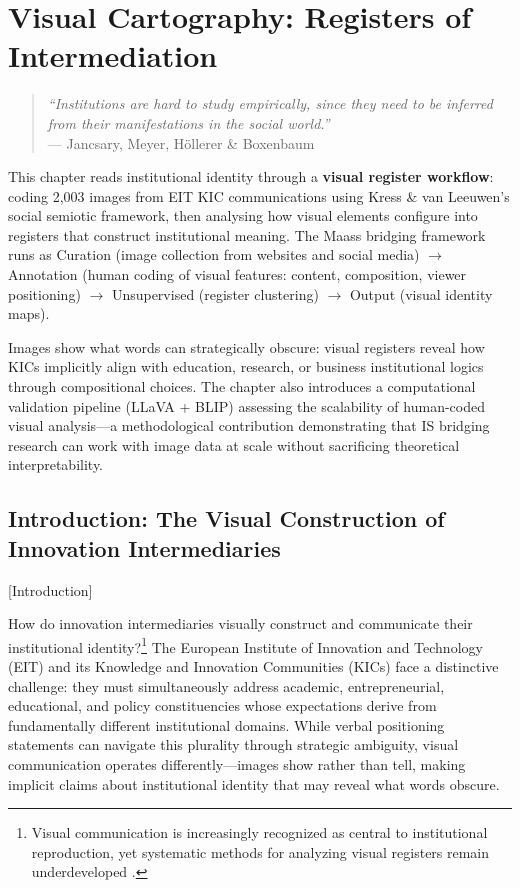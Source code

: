 \documentclass[../main.tex]{subfiles}
\begin{document}
\chapter{Visual Cartography: Registers of Intermediation}
\margintoc

\begin{quote}
\textit{``Institutions are hard to study empirically, since they need to be inferred from their manifestations in the social world.''}\\
--- Jancsary, Meyer, Höllerer \& Boxenbaum \cite{jancsary2018institutions}
\end{quote}

\begin{chapteroverview}
This chapter reads institutional identity through a \textbf{visual register workflow}: coding 2,003 images from EIT KIC communications using Kress \& van Leeuwen's social semiotic framework, then analysing how visual elements configure into registers that construct institutional meaning. The Maass bridging framework runs as Curation (image collection from websites and social media) $\rightarrow$ Annotation (human coding of visual features: content, composition, viewer positioning) $\rightarrow$ Unsupervised (register clustering) $\rightarrow$ Output (visual identity maps).

Images show what words can strategically obscure: visual registers reveal how KICs implicitly align with education, research, or business institutional logics through compositional choices. The chapter also introduces a computational validation pipeline (LLaVA + BLIP) assessing the scalability of human-coded visual analysis---a methodological contribution demonstrating that IS bridging research can work with image data at scale without sacrificing theoretical interpretability.
\end{chapteroverview}

\section{Introduction: The Visual Construction of Innovation Intermediaries}[Introduction]

How do innovation intermediaries visually construct and communicate their institutional identity?\footnote{Visual communication is increasingly recognized as central to institutional reproduction, yet systematic methods for analyzing visual registers remain underdeveloped \cite{meyer2013visualizing}.} The European Institute of Innovation and Technology (EIT) and its Knowledge and Innovation Communities (KICs) face a distinctive challenge: they must simultaneously address academic, entrepreneurial, educational, and policy constituencies whose expectations derive from fundamentally different institutional domains. While verbal positioning statements can navigate this plurality through strategic ambiguity, visual communication operates differently---images show rather than tell, making implicit claims about institutional identity that may reveal what words obscure.
\end{document}
